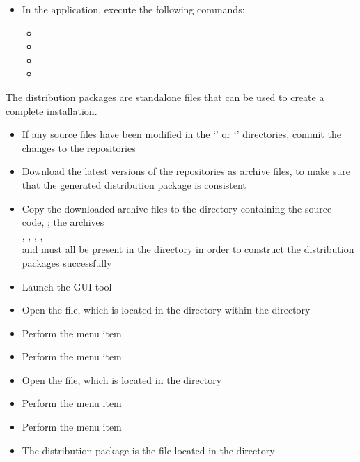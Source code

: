 \begin{itemize}
\item In the  application, execute the following commands:
\begin{itemize}
\item {}
\item\exSp{}
\item\exSp{}
\item\exSp{}
\end{itemize}
\end{itemize}
\tertiaryEnd
\secondaryEnd
{}
The distribution packages are standalone files that can be used to create a complete
\mplusm{} installation.
\begin{itemize}
\item If any source files have been modified in the `' or
`' directories, commit the changes to the
 repositories
\item\exSp{}Download the latest versions of the  repositories as 
archive files, to make sure that the generated distribution package is consistent
\item\exSp{}Copy the downloaded  archive files to the directory containing
the \mplusm{} source code, ; the archives\\
, ,
, ,\\
 and  must
all be present in the  directory in order to construct the
distribution packages successfully
\item\exSp{}Launch the  GUI tool
\item\exSp{}Open the  file, which is located in the
 directory within the 
directory
\item\exSp{}Perform the menu item 
\item\exSp{}Perform the menu item 
\item\exSp{}Open the  file, which is located in the
 directory
\item\exSp{}Perform the menu item 
\item\exSp{}Perform the menu item 
\item\exSp{}The distribution package is the  file located in the
 directory
\end{itemize}
